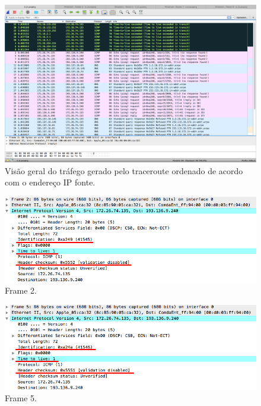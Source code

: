 \documentclass{llncs}
\begin{document}
\begin{figure}[H]
\begin{center}
\includegraphics[scale=0.30]{2_e.png} 
\end{center}
\caption{\label{fig:2_e}Visão geral do tráfego gerado pelo traceroute ordenado de acordo com o endereço IP fonte.}
\end{figure}

\begin{figure}[H]
\begin{center}
\includegraphics[scale=0.45]{2_e_1.png} 
\end{center}
\caption{\label{fig:2_e_1}Frame 2.}
\end{figure}

\begin{figure}[H]
\begin{center}
\includegraphics[scale=0.45]{2_e_2.png} 
\end{center}
\caption{\label{fig:2_e_2}Frame 5.}
\end{figure}
\end{document}

